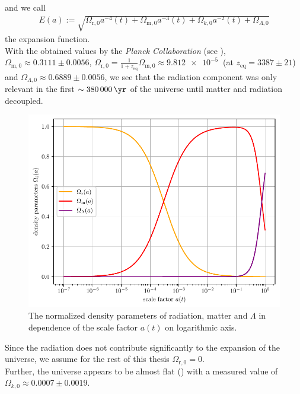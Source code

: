 and we call 
\begin{align}
    E(a) := \sqrt{\Omega_{\text{r},0} a^{-4}(t) + \Omega_{\text{m},0} a^{-3}(t) + \Omega_{k,0} a^{-2}(t) + \Omega_{\Lambda,0}} \label{eq:expansion-function} 
\end{align}
the expansion function. \\

\noindent With the obtained values by the \textit{Planck Collaboration} (see \cite[Table 7]{Planck2020}), $\Omega_{\text{m},0} \approx 0.3111 \pm 0.0056$, $\Omega_{\text{r},0} = \frac{1}{1 + z_{\text{eq}}} \Omega_{\text{m},0} \approx \SI{9.812e-5}{}$ (at $z_{\text{eq}} = 3387 \pm 21$) and $\Omega_{\Lambda,0} \approx 0.6889 \pm 0.0056$, we see that the radiation component was only relevant in the first $\sim \SI{380000}{\yr}$ of the universe until matter and radiation decoupled.

\begin{figure}[H]
    \centering
    \includegraphics[scale=1.0]{figures/plots/PDF/scale-factor-vs-density-parameters}
    \caption{The normalized density parameters of radiation, matter and $\Lambda$ in dependence of the scale factor $a(t)$ on logarithmic axis.}
    \label{fig:scale-factor-vs-density-parameters}
\end{figure}

\noindent Since the radiation does not contribute significantly to the expansion of the universe, we assume for the rest of this thesis $\Omega_{\text{r},0} = 0$. \label{no-radiation} \\
Further, the universe appears to be almost flat (\cite[Table 7]{Planck2020}) with a measured value of $\Omega_{k,0} \approx 0.0007 \pm 0.0019$. 

